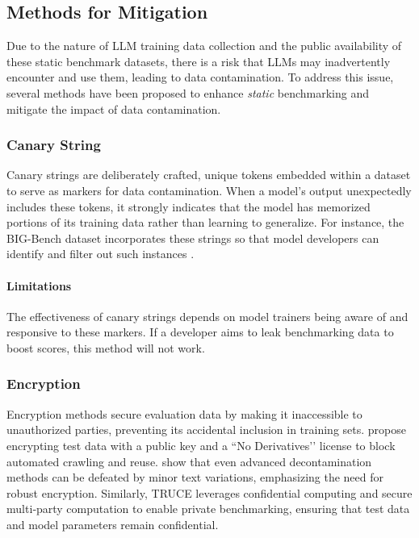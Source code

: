 \subsection{Methods for Mitigation}
Due to the nature of LLM training data collection and the public availability of these static benchmark datasets, there is a risk that LLMs may inadvertently encounter and use them, leading to data contamination. To address this issue, several methods have been proposed to enhance \textit{static} benchmarking and mitigate the impact of data contamination.

\subsubsection{Canary String}
Canary strings are deliberately crafted, unique tokens embedded within a dataset to serve as markers for data contamination. When a model’s output unexpectedly includes these tokens, it strongly indicates that the model has memorized portions of its training data rather than learning to generalize. For instance, the BIG-Bench dataset incorporates these strings so that model developers can identify and filter out such instances \cite{jacovi-etal-2023-stop}. 

\paragraph{Limitations} The effectiveness of canary strings depends on model trainers being aware of and responsive to these markers. 
If a developer aims to leak benchmarking data to boost scores, this method will not work.

\subsubsection{Encryption}
Encryption methods secure evaluation data by making it inaccessible to unauthorized parties, preventing its accidental inclusion in training sets. \citet{jacovi-etal-2023-stop} propose encrypting test data with a public key and a ``No Derivatives’’ license to block automated crawling and reuse. \citet{yang2023rethinking} show that even advanced decontamination methods can be defeated by minor text variations, emphasizing the need for robust encryption. Similarly, TRUCE \citep{chandran2024private} leverages confidential computing and secure multi‐party computation to enable private benchmarking, ensuring that test data and model parameters remain confidential. 

